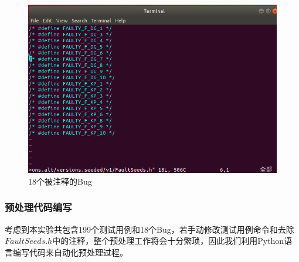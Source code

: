 \documentclass[12pt, a4paper, oneside,bibend=bibtex]{ctexart}
\begin{document}
\begin{figure}[htbp]
    \centering
    \includegraphics[width=14cm]{images/fseed.png}
    \caption{18个被注释的Bug}
    \label{fseed}
\end{figure}


\subsubsection{预处理代码编写}
考虑到本实验共包含199个测试用例和18个Bug，若手动修改测试用例命令和去除$FaultSeeds.h$中的注释，整个预处理工作将会十分繁琐，因此我们利用Python语言编写代码来自动化预处理过程。
\end{document}
